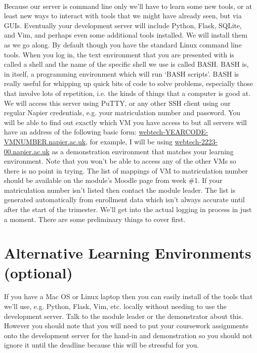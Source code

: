 \documentclass[12pt, a4paper, oneside]{book}
\begin{document}
\paragraph{} Because our server is command line only we'll have to learn some new tools, or at least new ways to interact with tools that we might have already seen, but via GUIs. Eventually your development server will include Python, Flask, SQLite, and Vim, and perhaps even some additional tools installed. We will install them as we go along. By default though you have the standard Linux command line tools. When you log in, the text environment that you are presented with is called a shell and the name of the specific shell we use is called BASH. BASH is, in itself, a programming environment which will run `BASH scripts'. BASH is really useful for whipping up quick bits of code to solve problems, especially those that involve lots of repetition, i.e. the kinds of things that a computer is good at. We will access this server using PuTTY, or any other SSH client using our regular Napier credentials, e.g. your matriculation number and password. You will be able to find out exactly which VM you have access to but all servers will have an address of the following basic form: \url{webtech-YEARCODE-VMNUMBER.napier.ac.uk}, for example, I will be using  \url{webtech-2223-00.napier.ac.uk} as a demonstration environment that matches your learning environment. Note that you won't be able to access any of the other VMs so there is no point in trying. The list of mappings of VM to matriculation number should be available on the module's Moodle page from week \#1. If your matriculation number isn't listed then contact the module leader. The list is generated automatically from enrollment data which isn't always accurate until after the start of the trimester. We'll get into the actual logging in process in just a moment. There are some preliminary things to cover first.

\section{Alternative Learning Environments (optional)}
\label{alternatives}
\paragraph{} If you have a Mac OS or Linux laptop then you can easily install of the tools that we'll use, e.g. Python, Flask, Vim, etc. locally without needing to use the development server. Talk to the module leader or the demonstrator about this. However you should note that you will need to put your coursework assignments onto the development server for the hand-in and demonstration so you should not ignore it until the deadline because this will be stressful for you.
\end{document}
